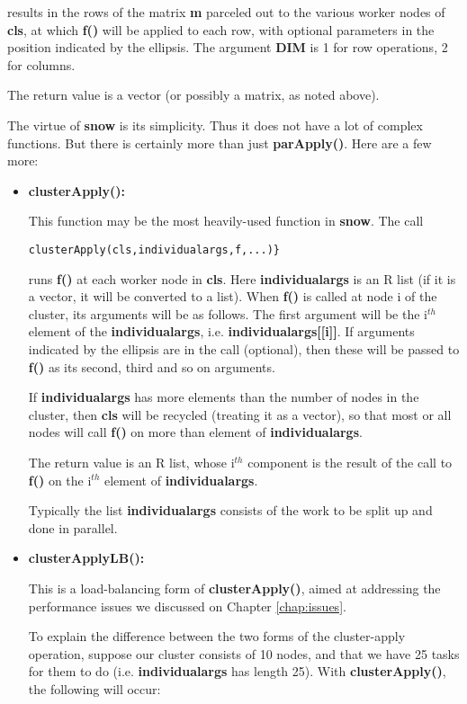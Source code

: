 results in the rows of the matrix {\bf m} parceled out to the various
worker nodes of {\bf cls}, at which {\bf f()} will be applied to each
row, with optional parameters in the position indicated by the ellipsis.
The argument {\bf DIM} is 1 for row operations, 2 for columns.

The return value is a vector (or possibly a matrix, as noted above).

The virtue of {\bf snow} is its simplicity.  Thus it does not have a lot
of complex functions.  But there is certainly more than just {\bf
parApply()}.  Here are a few more:

\begin{itemize}

\item {\bf clusterApply():}

This function may be the most heavily-used function in {\bf snow}.  The
call

\begin{lstlisting}
clusterApply(cls,individualargs,f,...)}
\end{lstlisting}

runs {\bf f()} at each worker node in {\bf cls}.  Here {\bf
individualargs} is an R list (if it is a vector, it will be converted to
a list).  When {\bf f()} is called at node i of the cluster, its
arguments will be as follows.  The first argument will be the i$^{th}$
element of the {\bf individualargs}, i.e. {\bf individualargs[[i]]}.  If
arguments indicated by the ellipsis are in the call (optional), then
these will be passed to {\bf f()} as its second, third and so on
arguments.

If {\bf individualargs} has more elements than the number of nodes in
the cluster, then {\bf cls} will be recycled (treating it as a vector),
so that most or all nodes will call {\bf f()} on more than element of
{\bf individualargs}.

The return value is an R list, whose i$^{th}$ component is the result of
the call to {\bf f()} on the i$^{th}$ element of {\bf individualargs}.

Typically the list {\bf individualargs} consists of the work to be split
up and done in parallel.

\item {\bf clusterApplyLB():}

This is a load-balancing form of {\bf clusterApply()}, aimed at
addressing the performance issues we discussed on Chapter
\ref{chap:issues}.

To explain the difference between the two forms of the cluster-apply
operation, suppose our cluster consists of 10 nodes, and that we have 25
tasks for them to do (i.e. {\bf individualargs} has length 25).  With
{\bf clusterApply()}, the following will occur:


\end{itemize}

